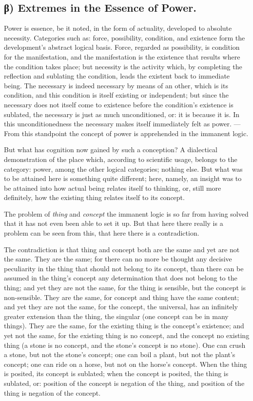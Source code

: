 \documentclass[12pt]{book}
\begin{document}
\subsection*{β) Extremes in the Essence of Power.}

Power is essence, be it noted, in the form of actuality, developed
to absolute necessity. Categories such as: force, possibility,
condition, and existence form the development's abstract logical
basis. Force, regarded as possibility, is condition for the
manifestation, and the manifestation is the existence that results
where the condition takes place; but necessity is the activity
which, by completing the reflection and sublating the condition,
leads the existent back to immediate being. The necessary is indeed
necessary by means of an other, which is its condition, and this
condition is itself existing or independent; but since the necessary
does not itself come
to existence before the condition's existence is sublated, the
necessary is just as much unconditioned, or: it is because it is. In
this unconditionedness the necessary makes itself immediately felt
as power. --- From this standpoint the concept of power is
apprehended in the immanent logic.

But what has cognition now gained by such a conception? A
dialectical demonstration of the place which, according to
scientific usage, belongs to the category: power, among the other
logical categories; nothing else. But what was to be attained here
is something quite different; here, namely, an insight was to be
attained into how actual being relates itself to thinking, or, still
more definitely, how the existing thing relates itself to its
concept.

The problem of \emph{thing} and \emph{concept} the immanent logic is
so far from having solved that it has not even been able to set it
up. But that here there really is a problem can be seen from this,
that here there is a contradiction.

The contradiction is that thing and concept both are the same and
yet are not the same. They are the same; for there can no more be
thought any decisive peculiarity in the thing that should not belong
to its concept, than there can be assumed in the thing's concept any
determination that does not belong to the thing; and yet they are
not the same, for the thing is sensible, but the concept is
non-sensible. They are the same, for concept and thing have the same
content; and yet they are not the same, for the concept, the
universal, has an infinitely greater extension than the thing, the
singular (one concept can be in many things). They are the same, for
the existing thing is the concept's existence; and yet not the same,
for the existing thing is no concept, and the concept no existing
thing (a stone is no concept, and the stone's concept is no stone).
One can crush a stone, but not the stone's concept; one can boil a
plant, but not the plant's concept; one can ride on a horse, but not
on
the horse's concept. When the thing is posited, its concept is
sublated; when the concept is posited, the thing is sublated, or:
position of the concept is negation of the thing, and position of
the thing is negation of the concept.
\end{document}

